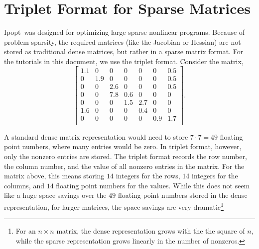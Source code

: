 \documentclass[letter,10pt]{article}
\newcommand{\Ipopt}{{\sc Ipopt}}
\begin{document}
 
 



\appendix
\section{Triplet Format for Sparse Matrices}\label{app.triplet}
\Ipopt\ was designed for optimizing large sparse nonlinear programs. 
Because of problem sparsity, the required matrices (like the Jacobian or Hessian) are not stored as traditional dense matrices, but rather in a sparse matrix format. For the tutorials in this document, we use the triplet format. 
Consider the matrix,
\[
\left[
\begin{array}{ccccccc}
1.1     & 0             & 0             & 0             & 0             & 0             & 0.5 \\
0       & 1.9   & 0             & 0             & 0             & 0             & 0.5 \\
0       & 0             & 2.6   & 0             & 0             & 0             & 0.5 \\
0       & 0             & 7.8   & 0.6   & 0             & 0             & 0    \\
0       & 0             & 0             & 1.5   & 2.7   & 0             & 0     \\
1.6     & 0             & 0             & 0             & 0.4   & 0             & 0     \\
0       & 0             & 0             & 0             & 0             & 0.9   & 1.7 \\
\end{array}
\right].
\]

A standard dense matrix representation would need to store $7 \cdot
7{=} 49$ floating point numbers, where many entries would be zero. In
triplet format, however, only the nonzero entries are stored. The
triplet format records the row number, the column number, and the
value of all nonzero entries in the matrix. For the matrix above, this
means storing $14$ integers for the rows, $14$ integers for the
columns, and $14$ floating point numbers for the values. While this
does not seem like a huge space savings over the $49$ floating point
numbers stored in the dense representation, for larger matrices, the
space savings are very dramatic\footnote{For an $n \times n$ matrix,
  the dense representation grows with the the square of $n$, while the
  sparse representation grows linearly in the number of nonzeros.}
\end{document}
